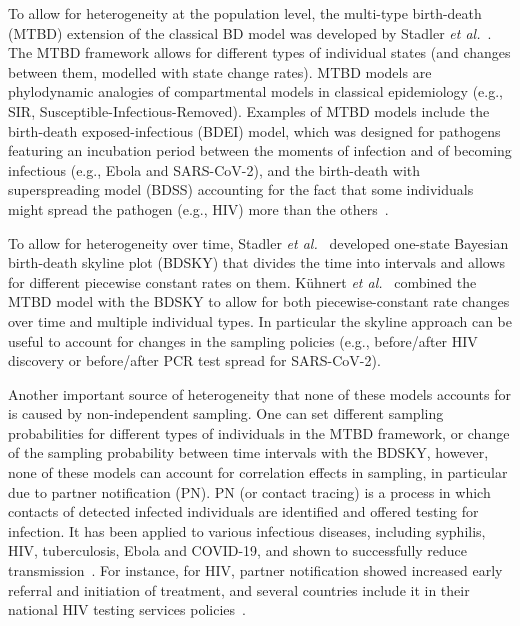 \documentclass[10pt,letterpaper]{article}
\begin{document}
To allow for heterogeneity at the population level, the multi-type birth-death (MTBD) extension of the classical BD model was developed by Stadler \textit{et al.}~\cite{Stadler2013a}. The MTBD framework allows for different types of individual states (and changes between them, modelled with state change rates). MTBD models are phylodynamic analogies of compartmental models in classical epidemiology (e.g., SIR, Susceptible-Infectious-Removed).  Examples of MTBD models include the birth-death exposed-infectious (BDEI) model, which was designed for pathogens featuring an incubation period between the moments of infection and of becoming infectious (e.g., Ebola and SARS-CoV-2), and the birth-death with superspreading model (BDSS) accounting for the fact that some individuals might spread the pathogen (e.g., HIV) more than the others~\cite{Stadler2014}.

To allow for heterogeneity over time, Stadler \textit{et al.}~\cite{Stadler2013} developed one-state Bayesian birth-death skyline plot (BDSKY) that divides the time into intervals and allows for different piecewise constant rates on them. Kühnert \textit{et al.}~\cite{Kuhnert2016} combined the MTBD model with the BDSKY to allow for both piecewise-constant rate changes over time and multiple individual types. In particular the skyline approach can be useful to account for changes in the sampling policies (e.g., before/after HIV discovery or before/after PCR test spread for SARS-CoV-2).


Another important source of heterogeneity that none of these models accounts for is caused by non-independent sampling. One can set different sampling probabilities for different types of individuals in the MTBD framework, or change of the sampling probability between time intervals with the BDSKY, however, none of these models can account for correlation effects in sampling, in particular due to partner notification (PN). PN (or contact tracing) is a process in which contacts of detected infected individuals are identified and offered testing for infection. It has been applied to various infectious diseases, including syphilis, HIV, tuberculosis, Ebola and COVID-19, and shown to successfully reduce transmission~\cite{el-sadrContactTracingBarriers2022}. For instance, for HIV,  partner notification showed increased early referral and initiation of treatment, and several countries include it in their national HIV testing services policies~\cite{worldhealthorganizationCountryPolicyReview2016}. 

\bigskip
\end{document}
